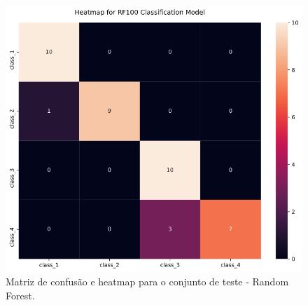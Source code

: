 \documentclass[
	article,			%
	11pt,				%
	oneside,			%
	a4paper,			%
	english,			%
	brazil,				%
	sumario=tradicional
	]{abntex2}
\begin{document}
\begin{figure}[h!]
 \centering
 \includegraphics[scale=0.5]{fig/rf_cm.png}
 \caption{Matriz de confusão e heatmap para o conjunto de teste - Random Forest.}
 \label{fig:rf_cm}
\end{figure}
\end{document}

